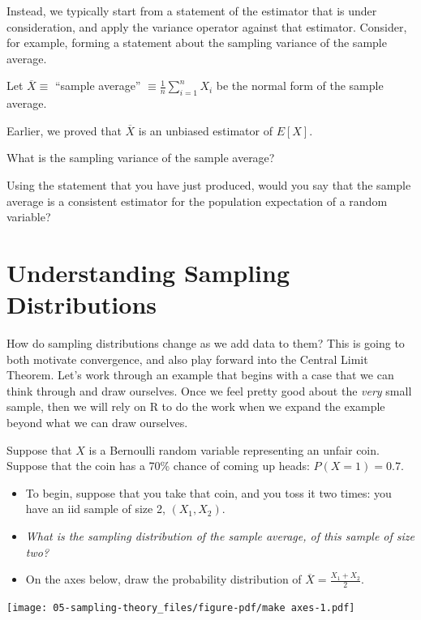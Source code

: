 \documentclass[
  letterpaper,
  DIV=11,
  numbers=noendperiod]{scrreprt}
\providecommand{\tightlist}{%
  \setlength{\itemsep}{0pt}\setlength{\parskip}{0pt}}\usepackage{longtable,booktabs,array}
\begin{document}
Instead, we typically start from a statement of the estimator that is
under consideration, and apply the variance operator against that
estimator. Consider, for example, forming a statement about the sampling
variance of the sample average.

Let \(\overline{X} \equiv\) ``sample average''
\(\equiv \frac{1}{n}\sum_{i=1}^{n}X_{i}\) be the normal form of the
sample average.

Earlier, we proved that \(\overline{X}\) is an unbiased estimator of
\(E[X]\).

What is the sampling variance of the sample average?

\vspace{20cm}

Using the statement that you have just produced, would you say that the
sample average is a consistent estimator for the population expectation
of a random variable?

\section{Understanding Sampling
Distributions}\label{understanding-sampling-distributions}

How do sampling distributions change as we add data to them? This is
going to both motivate convergence, and also play forward into the
Central Limit Theorem. Let's work through an example that begins with a
case that we can think through and draw ourselves. Once we feel pretty
good about the \emph{very} small sample, then we will rely on R to do
the work when we expand the example beyond what we can draw ourselves.

Suppose that \(X\) is a Bernoulli random variable representing an unfair
coin. Suppose that the coin has a 70\% chance of coming up heads:
\(P(X=1) = 0.7\).

\begin{itemize}
\tightlist
\item
  To begin, suppose that you take that coin, and you toss it two times:
  you have an iid sample of size 2, \((X_1,X_2)\).
\item
  \emph{What is the sampling distribution of the sample average, of this
  sample of size two?}
\item
  On the axes below, draw the probability distribution of
  \(\overline X = \frac{X_1+X_2}{2}\).
\end{itemize}

\texttt{[image: 05-sampling-theory\_files/figure-pdf/make axes-1.pdf]}
\end{document}

